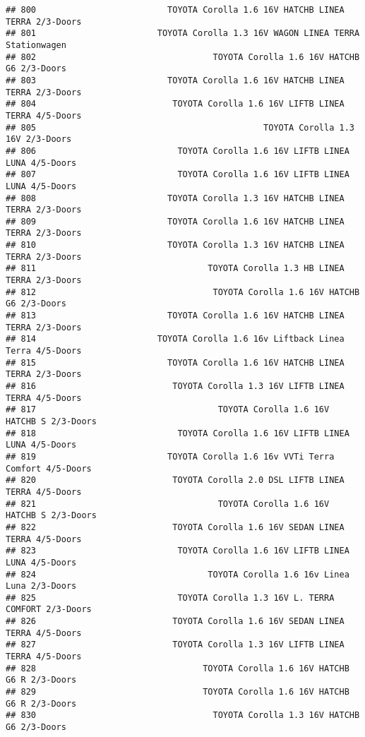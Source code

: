 \documentclass[]{article}
\begin{document}
\begin{verbatim}
## 800                          TOYOTA Corolla 1.6 16V HATCHB LINEA TERRA 2/3-Doors
## 801                        TOYOTA Corolla 1.3 16V WAGON LINEA TERRA Stationwagen
## 802                                   TOYOTA Corolla 1.6 16V HATCHB G6 2/3-Doors
## 803                          TOYOTA Corolla 1.6 16V HATCHB LINEA TERRA 2/3-Doors
## 804                           TOYOTA Corolla 1.6 16V LIFTB LINEA TERRA 4/5-Doors
## 805                                             TOYOTA Corolla 1.3 16V 2/3-Doors
## 806                            TOYOTA Corolla 1.6 16V LIFTB LINEA LUNA 4/5-Doors
## 807                            TOYOTA Corolla 1.6 16V LIFTB LINEA LUNA 4/5-Doors
## 808                          TOYOTA Corolla 1.3 16V HATCHB LINEA TERRA 2/3-Doors
## 809                          TOYOTA Corolla 1.6 16V HATCHB LINEA TERRA 2/3-Doors
## 810                          TOYOTA Corolla 1.3 16V HATCHB LINEA TERRA 2/3-Doors
## 811                                  TOYOTA Corolla 1.3 HB LINEA TERRA 2/3-Doors
## 812                                   TOYOTA Corolla 1.6 16V HATCHB G6 2/3-Doors
## 813                          TOYOTA Corolla 1.6 16V HATCHB LINEA TERRA 2/3-Doors
## 814                        TOYOTA Corolla 1.6 16v Liftback Linea Terra 4/5-Doors
## 815                          TOYOTA Corolla 1.6 16V HATCHB LINEA TERRA 2/3-Doors
## 816                           TOYOTA Corolla 1.3 16V LIFTB LINEA TERRA 4/5-Doors
## 817                                    TOYOTA Corolla 1.6 16V HATCHB S 2/3-Doors
## 818                            TOYOTA Corolla 1.6 16V LIFTB LINEA LUNA 4/5-Doors
## 819                          TOYOTA Corolla 1.6 16v VVTi Terra Comfort 4/5-Doors
## 820                           TOYOTA Corolla 2.0 DSL LIFTB LINEA TERRA 4/5-Doors
## 821                                    TOYOTA Corolla 1.6 16V HATCHB S 2/3-Doors
## 822                           TOYOTA Corolla 1.6 16V SEDAN LINEA TERRA 4/5-Doors
## 823                            TOYOTA Corolla 1.6 16V LIFTB LINEA LUNA 4/5-Doors
## 824                                  TOYOTA Corolla 1.6 16v Linea Luna 2/3-Doors
## 825                            TOYOTA Corolla 1.3 16V L. TERRA COMFORT 2/3-Doors
## 826                           TOYOTA Corolla 1.6 16V SEDAN LINEA TERRA 4/5-Doors
## 827                           TOYOTA Corolla 1.3 16V LIFTB LINEA TERRA 4/5-Doors
## 828                                 TOYOTA Corolla 1.6 16V HATCHB G6 R 2/3-Doors
## 829                                 TOYOTA Corolla 1.6 16V HATCHB G6 R 2/3-Doors
## 830                                   TOYOTA Corolla 1.3 16V HATCHB G6 2/3-Doors

\end{verbatim}
\end{document}
